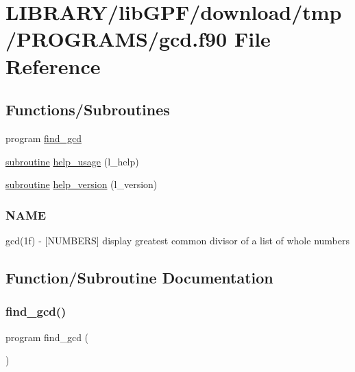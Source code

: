 \hypertarget{gcd_8f90}{}\section{L\+I\+B\+R\+A\+R\+Y/lib\+G\+P\+F/download/tmp/\+P\+R\+O\+G\+R\+A\+M\+S/gcd.f90 File Reference}
\label{gcd_8f90}
\subsection*{Functions/\+Subroutines}
\begin{DoxyCompactItemize}
\item 
program \hyperlink{gcd_8f90_a38924afeefabd20962a8d2f87c2949d7}{find\+\_\+gcd}
\item 
\hyperlink{M__stopwatch_83_8txt_acfbcff50169d691ff02d4a123ed70482}{subroutine} \hyperlink{gcd_8f90_a3e09a3b52ee8fb04eeb93fe5761626a8}{help\+\_\+usage} (l\+\_\+help)
\item 
\hyperlink{M__stopwatch_83_8txt_acfbcff50169d691ff02d4a123ed70482}{subroutine} \hyperlink{gcd_8f90_a39c21619b08a3c22f19e2306efd7f766}{help\+\_\+version} (l\+\_\+version)
\begin{DoxyCompactList}\small\item\em \subsubsection*{N\+A\+ME}

gcd(1f) -\/ \mbox{[}N\+U\+M\+B\+E\+RS\mbox{]} display greatest common divisor of a list of whole numbers \end{DoxyCompactList}\end{DoxyCompactItemize}


\subsection{Function/\+Subroutine Documentation}
\mbox{\label{gcd_8f90_a38924afeefabd20962a8d2f87c2949d7}} 
\subsubsection{\texorpdfstring{find\+\_\+gcd()}{find\_gcd()}}
{\footnotesize\ttfamily program find\+\_\+gcd (\begin{DoxyParamCaption}{ }\end{DoxyParamCaption})}



